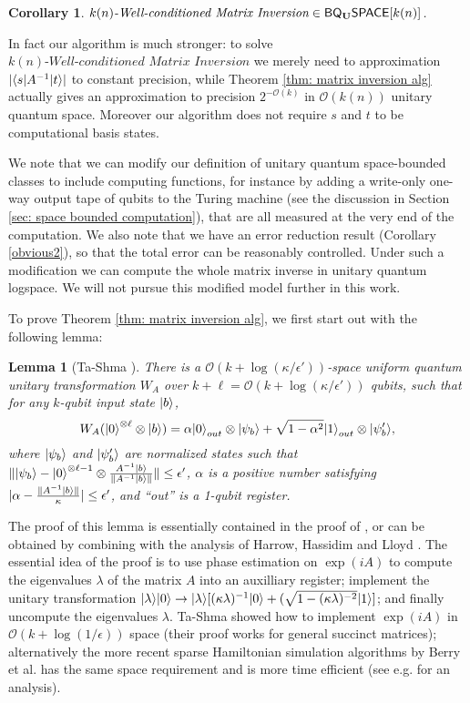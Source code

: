 \documentclass[11pt]{article}
\newtheorem{lemma}{Lemma}
\newtheorem{corollary}[theorem]{Corollary}
\theoremstyle{definition}
\theoremstyle{remark}
\theoremstyle{definition}
\newcommand\matrixinvert[1]{{\ensuremath{#1}}\textit{-Well-conditioned Matrix Inversion}}
\newcommand{\classfont}{\sf}
\newcommand{\Unitary}{\mathbf{U}}
\newcommand{\unitaryBQSPACE}[1]{{\classfont{BQ}_\Unitary\classfont{SPACE}}[#1]}
\newcommand\bigoh{\mathcal{O}}
\newcommand{\wf}[1]{{\color{violet}{[{\bf wf:}#1]}}}
\begin{document}
\begin{corollary}
$\matrixinvert{k(n)} \in \unitaryBQSPACE{k(n)}$.
\end{corollary}
In fact our algorithm is much stronger: to solve $\matrixinvert{k(n)}$ we merely need to approximation $|{\left\langle{s}\right\vert}A^{-1}{\left\vert{t}\right\rangle}|$ to constant precision, while Theorem \ref{thm: matrix inversion alg} actually gives an approximation to precision $2^{-\bigoh (k)}$ in $\bigoh (k(n))$ unitary quantum space. Moreover our algorithm does not require $s$ and $t$ to be computational basis states.

We note that we can modify our definition of unitary quantum space-bounded classes to include computing functions, for instance by adding a write-only one-way output tape of qubits to the Turing machine (see the discussion in Section \ref{sec: space bounded computation}), that are all measured at the very end of the computation. We also note that we have an error reduction result (Corollary \ref{obvious2}), so that the total error can be reasonably controlled. Under such a modification we can compute the whole matrix inverse in unitary quantum logspace. We will not pursue this modified model further in this work.

To prove Theorem \ref{thm: matrix inversion alg}, we first start out with the following lemma:
\begin{lemma}[Ta-Shma \cite{tashma}] \label{lem: matrix inversion lemma}
There is a $\bigoh (k + \log(\kappa/\epsilon'))$-space uniform quantum unitary transformation $W_A$ over $k+\ell = \bigoh (k+ \log(\kappa/\epsilon'))$ qubits, such that for any $k$-qubit input state ${\left\vert{b}\right\rangle}$,
\begin{equation}
W_A ({\left\vert{0}\right\rangle}^{\otimes \ell} \otimes {\left\vert{b}\right\rangle}) = \alpha {\left\vert{0}\right\rangle}_{out} \otimes {\left\vert{\psi_b}\right\rangle} + \sqrt{1-\alpha^2} {\left\vert{1}\right\rangle}_{out} \otimes{\left\vert{\psi'_b}\right\rangle},
\end{equation}
where ${\left\vert{\psi_b}\right\rangle}$ and ${\left\vert{\psi'_b}\right\rangle}$ are normalized states such that $\| {\left\vert{\psi_b}\right\rangle} - {\left\vert{0}\right\rangle}^{\otimes \ell-1} \otimes \frac{A^{-1}{\left\vert{b}\right\rangle}} {\|A^{-1}{\left\vert{b}\right\rangle}\|} \| \le \epsilon'$, $\alpha$ is a positive number satisfying $|\alpha - \frac{\|A^{-1}{\left\vert{b}\right\rangle}\|}{\kappa}| \le \epsilon'$, and ``out'' is a 1-qubit register.
\end{lemma}
The proof of this lemma is essentially contained in the proof of \cite[Theorem~6.3]{tashma}, or can be obtained by combining \cite[Theorem~4.1]{tashma} with the analysis of Harrow, Hassidim and Lloyd \cite{HHL}. The essential idea of the proof is to use phase estimation on $\exp(iA)$ to compute the eigenvalues $\lambda$ of the matrix $A$ into an auxilliary register; implement the unitary transformation ${\left\vert{\lambda}\right\rangle}{\left\vert{0}\right\rangle} \rightarrow {\left\vert{\lambda}\right\rangle}[(\kappa\lambda)^{-1}{\left\vert{0}\right\rangle}+(\sqrt{1-(\kappa\lambda)^{-2}}{\left\vert{1}\right\rangle}]$; and finally uncompute the eigenvalues $\lambda$. Ta-Shma showed how to implement $\exp(iA)$ in $\bigoh (k+\log(1/\epsilon))$ space \cite[Theorem~4.1]{tashma} (their proof works for general succinct matrices); alternatively the more recent sparse Hamiltonian simulation algorithms by Berry et al. has the same space requirement and is more time efficient (see e.g. \cite{bccks15} for an analysis).
\end{document}
